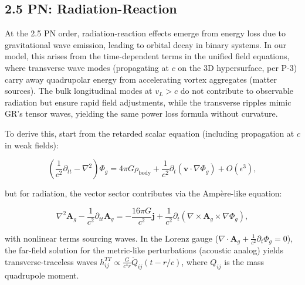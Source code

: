 \medskip
\noindent
{}
\medskip

\subsection{2.5 PN: Radiation-Reaction}

At the 2.5 PN order, radiation-reaction effects emerge from energy loss due to gravitational wave emission, leading to orbital decay in binary systems. In our model, this arises from the time-dependent terms in the unified field equations, where transverse wave modes (propagating at $c$ on the 3D hypersurface, per P-3) carry away quadrupolar energy from accelerating vortex aggregates (matter sources). The bulk longitudinal modes at $v_L > c$ do not contribute to observable radiation but ensure rapid field adjustments, while the transverse ripples mimic GR's tensor waves, yielding the same power loss formula without curvature.

To derive this, start from the retarded scalar equation (including propagation at $c$ in weak fields):

\[
\left( \frac{1}{c^2} \partial_{tt} - \nabla^2 \right) \Phi_g = 4\pi G \rho_{\text{body}} + \frac{1}{c^2} \partial_t (\mathbf{v} \cdot \nabla \Phi_g) + O(\epsilon^3),
\]

but for radiation, the vector sector contributes via the Ampère-like equation:

\[
\nabla^2 \mathbf{A}_g - \frac{1}{c^2} \partial_{tt} \mathbf{A}_g = -\frac{16\pi G}{c^2} \mathbf{j} + \frac{1}{c^2} \partial_t (\nabla \times \mathbf{A}_g \times \nabla \Phi_g),
\]

with nonlinear terms sourcing waves. In the Lorenz gauge ($\nabla \cdot \mathbf{A}_g + \frac{1}{c^2} \partial_t \Phi_g = 0$), the far-field solution for the metric-like perturbations (acoustic analog) yields transverse-traceless waves $h_{ij}^{TT} \propto \frac{G}{c^4 r} \ddot{Q}_{ij}(t - r/c)$, where $Q_{ij}$ is the mass quadrupole moment.

